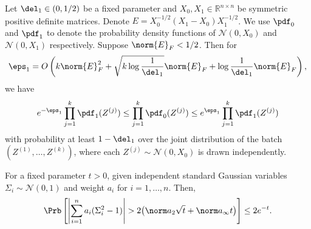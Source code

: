 \begin{lemma}\label{lem:gaussian-privacy}
Let $\del_1 \in(0,1/2)$ be a fixed parameter and $X_0,X_1\in\mathbb{R}^{n\times n}$ be symmetric positive definite matrices. Denote $E=X_0^{-1/2}(X_1-X_0)X_1^{-1/2}$. We use $\pdf_0$ and $\pdf_1$ to denote the probability density functions of $\mathcal{N}(0,X_0)$ and $\mathcal{N}(0,X_1)$ respectively. Suppose $\norm{E}_F<1/2$. Then for \[\eps_1=O\left(k\norm{E}_F^2+\sqrt{k\log\frac{1}{\del_1}}\norm{E}_F+\log\frac{1}{\del_1}\norm{E}_F\right),\] we have \[e^{-\eps_1}\prod_{j=1}^k\pdf_1(Z^{(j)})\leq\prod_{j=1}^k\pdf_0(Z^{(j)})\leq e^{\eps_1}\prod_{j=1}^k\pdf_1(Z^{(j)})\] with probability at least $1-\del_1$ over the joint distribution of the batch   $(Z^{(1)}, \dots, Z^{(k)})$, where each $Z^{(j)} \sim \mathcal{N}(0, X_0)$ is drawn independently.
\end{lemma}

\begin{lemma}\label{lem:concentration_chi-squares}
For a fixed parameter $t>0$, given independent standard Gaussian variables $\Sigma_i\sim\mathcal{N}(0,1)$ and weight $a_i$ for $i=1,\dots,n$.  Then,
\[
 \Prb\left[\left|\sum_{i=1}^n a_i(\Sigma_i^2-1)\right|
 >2\bigl(\norm a_2\sqrt t+\norm a_\infty t\bigr)\right]\leq2e^{-t}.
\]
\end{lemma}

